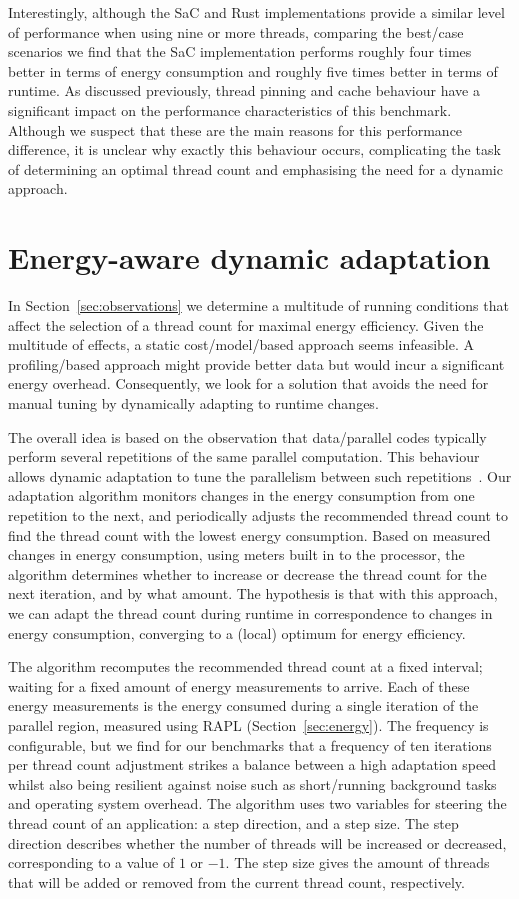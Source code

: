 Interestingly, although the SaC and Rust implementations provide a similar level of performance when using nine or more threads, comparing the best\-/case scenarios we find that the SaC implementation performs roughly four times better in terms of energy consumption and roughly five times better in terms of runtime.
As discussed previously, thread pinning and cache behaviour have a significant impact on the performance characteristics of this benchmark.
Although we suspect that these are the main reasons for this performance difference, it is unclear why exactly this behaviour occurs, complicating the task of determining an optimal thread count and emphasising the need for a dynamic approach.

\section{Energy-aware dynamic adaptation}\label{sec:implementation}
In Section~\ref{sec:observations} we determine a multitude of running conditions that affect the selection of a thread count for maximal energy efficiency.
Given the multitude of effects, a static cost\-/model\-/based approach seems infeasible.
A profiling\-/based approach might provide better data but would incur a significant energy overhead.
Consequently, we look for a solution that avoids the need for manual tuning by dynamically adapting to runtime changes.

The overall idea is based on the observation that data\-/parallel codes typically perform several repetitions of the same parallel computation.
This behaviour allows dynamic adaptation to tune the parallelism between such repetitions~\cite{gordon2015dynamic}.
Our adaptation algorithm monitors changes in the energy consumption from one repetition to the next, and periodically adjusts the recommended thread count to find the thread count with the lowest energy consumption.
Based on measured changes in energy consumption, using meters built in to the processor, the algorithm determines whether to increase or decrease the thread count for the next iteration, and by what amount.
The hypothesis is that with this approach, we can adapt the thread count during runtime in correspondence to changes in energy consumption, converging to a (local) optimum for energy efficiency.

The algorithm recomputes the recommended thread count at a fixed interval; waiting for a fixed amount of energy measurements to arrive.
Each of these energy measurements is the energy consumed during a single iteration of the parallel region, measured using RAPL (Section~\ref{sec:energy}).
The frequency is configurable, but we find for our benchmarks that a frequency of ten iterations per thread count adjustment strikes a balance between a high adaptation speed whilst also being resilient against noise such as short\-/running background tasks and operating system overhead.
The algorithm uses two variables for steering the thread count of an application: a step direction, and a step size.
The step direction describes whether the number of threads will be increased or decreased, corresponding to a value of $1$ or $-1$.
The step size gives the amount of threads that will be added or removed from the current thread count, respectively.

